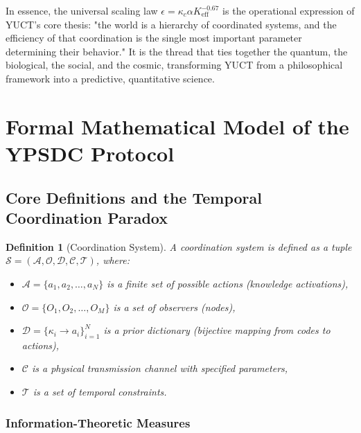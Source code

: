 \documentclass[11pt,a4paper]{article}
\newtheorem{definition}{Definition}
\begin{document}
In essence, the universal scaling law \(\epsilon = \kappa_c \alpha K_{\mathrm{eff}}^{-0.67}\) is the operational expression of YUCT's core thesis: "the world is a hierarchy of coordinated systems, and the efficiency of that coordination is the single most important parameter determining their behavior." It is the thread that ties together the quantum, the biological, the social, and the cosmic, transforming YUCT from a philosophical framework into a predictive, quantitative science.


\section{Formal Mathematical Model of the YPSDC Protocol}
\label{sec:formal-model}

\subsection{Core Definitions and the Temporal Coordination Paradox}

\begin{definition}[Coordination System]
	A coordination system is defined as a tuple $\mathcal{S} = (\mathcal{A}, \mathcal{O}, \mathcal{D}, \mathcal{C}, \mathcal{T})$, where:
	\begin{itemize}
		\item $\mathcal{A} = \{a_1, a_2, \dots, a_N\}$ is a finite set of possible actions (knowledge activations),
		\item $\mathcal{O} = \{O_1, O_2, \dots, O_M\}$ is a set of observers (nodes),
		\item $\mathcal{D} = \{\kappa_i \to a_i\}_{i=1}^N$ is a prior dictionary (bijective mapping from codes to actions),
		\item $\mathcal{C}$ is a physical transmission channel with specified parameters,
		\item $\mathcal{T}$ is a set of temporal constraints.
	\end{itemize}
\end{definition}

\subsubsection{Information-Theoretic Measures}
\end{document}
